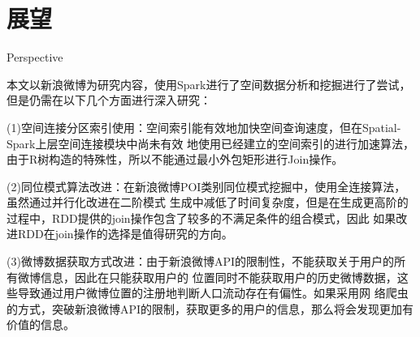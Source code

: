 \section{展望}{Perspective}

本文以新浪微博为研究内容，使用Spark进行了空间数据分析和挖掘进行了尝试，但是仍需在以下几个方面进行深入研究：

(1)空间连接分区索引使用：空间索引能有效地加快空间查询速度，但在Spatial-Spark上层空间连接模块中尚未有效
地使用已经建立的空间索引的进行加速算法，由于R树构造的特殊性，所以不能通过最小外包矩形进行Join操作。

(2)同位模式算法改进：在新浪微博POI类别同位模式挖掘中，使用全连接算法，虽然通过并行化改进在二阶模式
生成中减低了时间复杂度，但是在生成更高阶的过程中，RDD提供的join操作包含了较多的不满足条件的组合模式，因此
如果改进RDD在join操作的选择是值得研究的方向。

(3)微博数据获取方式改进：由于新浪微博API的限制性，不能获取关于用户的所有微博信息，因此在只能获取用户的
位置同时不能获取用户的历史微博数据，这些导致通过用户微博位置的注册地判断人口流动存在有偏性。如果采用网
络爬虫的方式，突破新浪微博API的限制，获取更多的用户的信息，那么将会发现更加有价值的信息。